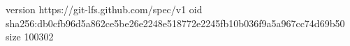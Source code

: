version https://git-lfs.github.com/spec/v1
oid sha256:db0cfb96d5a862ce5be26e2248e518772e2245fb10b036f9a5a967cc74d69b50
size 100302
